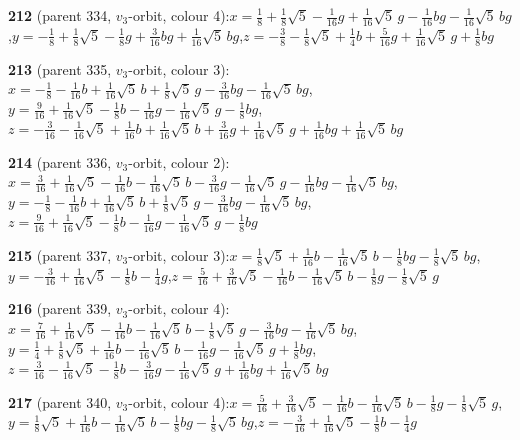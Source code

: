 \documentclass[10pt]{article}
\begin{document}
{\noindent\textbf{212} (parent 334, $v_3$-orbit, colour 4):\quad $x=\tfrac{1}{8}+\tfrac{1}{8}\sqrt5-\tfrac{1}{16}g+\tfrac{1}{16}\sqrt5\,g-\tfrac{1}{16}bg-\tfrac{1}{16}\sqrt5\,bg$,\quad $y=-\tfrac{1}{8}+\tfrac{1}{8}\sqrt5-\tfrac{1}{8}g+\tfrac{3}{16}bg+\tfrac{1}{16}\sqrt5\,bg$,\quad $z=-\tfrac{3}{8}-\tfrac{1}{8}\sqrt5+\tfrac{1}{4}b+\tfrac{5}{16}g+\tfrac{1}{16}\sqrt5\,g+\tfrac{1}{8}bg$\par\smallskip
\noindent\textbf{213} (parent 335, $v_3$-orbit, colour 3):\quad $x=-\tfrac{1}{8}-\tfrac{1}{16}b+\tfrac{1}{16}\sqrt5\,b+\tfrac{1}{8}\sqrt5\,g-\tfrac{3}{16}bg-\tfrac{1}{16}\sqrt5\,bg$,\quad $y=\tfrac{9}{16}+\tfrac{1}{16}\sqrt5-\tfrac{1}{8}b-\tfrac{1}{16}g-\tfrac{1}{16}\sqrt5\,g-\tfrac{1}{8}bg$,\quad $z=-\tfrac{3}{16}-\tfrac{1}{16}\sqrt5+\tfrac{1}{16}b+\tfrac{1}{16}\sqrt5\,b+\tfrac{3}{16}g+\tfrac{1}{16}\sqrt5\,g+\tfrac{1}{16}bg+\tfrac{1}{16}\sqrt5\,bg$\par\smallskip
\noindent\textbf{214} (parent 336, $v_3$-orbit, colour 2):\quad $x=\tfrac{3}{16}+\tfrac{1}{16}\sqrt5-\tfrac{1}{16}b-\tfrac{1}{16}\sqrt5\,b-\tfrac{3}{16}g-\tfrac{1}{16}\sqrt5\,g-\tfrac{1}{16}bg-\tfrac{1}{16}\sqrt5\,bg$,\quad $y=-\tfrac{1}{8}-\tfrac{1}{16}b+\tfrac{1}{16}\sqrt5\,b+\tfrac{1}{8}\sqrt5\,g-\tfrac{3}{16}bg-\tfrac{1}{16}\sqrt5\,bg$,\quad $z=\tfrac{9}{16}+\tfrac{1}{16}\sqrt5-\tfrac{1}{8}b-\tfrac{1}{16}g-\tfrac{1}{16}\sqrt5\,g-\tfrac{1}{8}bg$\par\smallskip
\noindent\textbf{215} (parent 337, $v_3$-orbit, colour 3):\quad $x=\tfrac{1}{8}\sqrt5+\tfrac{1}{16}b-\tfrac{1}{16}\sqrt5\,b-\tfrac{1}{8}bg-\tfrac{1}{8}\sqrt5\,bg$,\quad $y=-\tfrac{3}{16}+\tfrac{1}{16}\sqrt5-\tfrac{1}{8}b-\tfrac{1}{4}g$,\quad $z=\tfrac{5}{16}+\tfrac{3}{16}\sqrt5-\tfrac{1}{16}b-\tfrac{1}{16}\sqrt5\,b-\tfrac{1}{8}g-\tfrac{1}{8}\sqrt5\,g$\par\smallskip
\noindent\textbf{216} (parent 339, $v_3$-orbit, colour 4):\quad $x=\tfrac{7}{16}+\tfrac{1}{16}\sqrt5-\tfrac{1}{16}b-\tfrac{1}{16}\sqrt5\,b-\tfrac{1}{8}\sqrt5\,g-\tfrac{3}{16}bg-\tfrac{1}{16}\sqrt5\,bg$,\quad $y=\tfrac{1}{4}+\tfrac{1}{8}\sqrt5+\tfrac{1}{16}b-\tfrac{1}{16}\sqrt5\,b-\tfrac{1}{16}g-\tfrac{1}{16}\sqrt5\,g+\tfrac{1}{8}bg$,\quad $z=\tfrac{3}{16}-\tfrac{1}{16}\sqrt5-\tfrac{1}{8}b-\tfrac{3}{16}g-\tfrac{1}{16}\sqrt5\,g+\tfrac{1}{16}bg+\tfrac{1}{16}\sqrt5\,bg$\par\smallskip
\noindent\textbf{217} (parent 340, $v_3$-orbit, colour 4):\quad $x=\tfrac{5}{16}+\tfrac{3}{16}\sqrt5-\tfrac{1}{16}b-\tfrac{1}{16}\sqrt5\,b-\tfrac{1}{8}g-\tfrac{1}{8}\sqrt5\,g$,\quad $y=\tfrac{1}{8}\sqrt5+\tfrac{1}{16}b-\tfrac{1}{16}\sqrt5\,b-\tfrac{1}{8}bg-\tfrac{1}{8}\sqrt5\,bg$,\quad $z=-\tfrac{3}{16}+\tfrac{1}{16}\sqrt5-\tfrac{1}{8}b-\tfrac{1}{4}g$\par\smallskip
}
\end{document}
